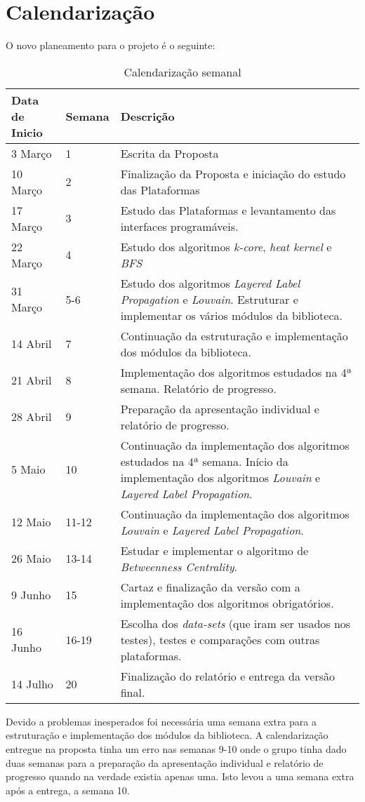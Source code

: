 \section{Calendarização}
O novo planeamento para o projeto é o seguinte:
\begin{table}[H]
 \caption{ Calendarização semanal}
 \begin{tabular}{|l|l|p{9.5cm}|}
 \hline
 \bf{Data de Inicio} & \bf{Semana} & \bf{Descrição} \\ \hline
 3 Março & 1 & Escrita da Proposta \\ \hline
 10 Março & 2 & Finalização da Proposta e iniciação do estudo das Plataformas \\ \hline
 17 Março & 3 & Estudo das Plataformas e levantamento das interfaces programáveis. \\ \hline
 22 Março & 4 & Estudo dos algoritmos \textit{k-core}, \textit{heat kernel} e \textit{BFS}  \\ \hline
 31 Março & 5-6 & Estudo dos algoritmos \textit {Layered Label Propagation} e \textit{Louvain}. Estruturar e implementar os vários módulos da biblioteca.\\ \hline
 14 Abril & 7 & Continuação da estruturação e implementação dos módulos da biblioteca.\\ \hline
 21 Abril & 8 & Implementação dos algoritmos estudados na 4ª semana. Relatório de progresso.\\ \hline
 28 Abril & 9 & Preparação da apresentação individual e relatório de progresso. \\ \hline
 5 Maio & 10 & Continuação da implementação dos algoritmos estudados na 4ª semana. Início da implementação dos algoritmos \textit{Louvain} e \textit{Layered Label Propagation}. \\\hline
 12 Maio & 11-12 & Continuação da implementação dos algoritmos \textit{Louvain} e \textit{Layered Label Propagation}.\\ \hline
 26 Maio & 13-14 & Estudar e implementar o algoritmo de \textit{Betweenness Centrality}. \\ \hline
 9 Junho & 15 & Cartaz e finalização da versão com a implementação dos algoritmos obrigatórios. \\ \hline
 16 Junho & 16-19 & Escolha dos \textit{data-sets} (que iram ser usados nos testes), testes e comparações com outras plataformas. \\ \hline
 14 Julho & 20 & Finalização do relatório e entrega da versão final. \\ \hline
\end{tabular}
\end{table}
Devido a problemas inesperados foi necessária uma semana extra para a estruturação e implementação dos módulos da biblioteca.
A calendarização entregue na proposta tinha um erro nas semanas 9-10 onde o grupo tinha dado duas semanas para a preparação da apresentação individual e relatório de progresso quando na verdade existia apenas uma. Isto levou a uma semana extra após a entrega, a semana 10.
